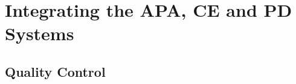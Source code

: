 \section{Integrating the APA, CE and PD Systems}
\label{sec:fdsp-tc-apa-integ}

\subsection{Quality Control} %
\label{sec:fdsp-tc-itf-qaqc}








